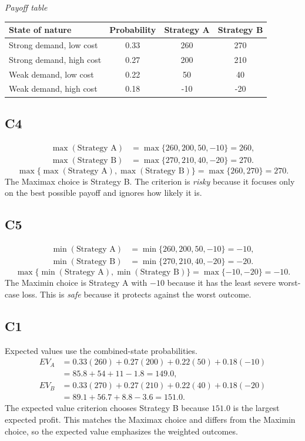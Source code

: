 		\begin{center}
			\textit{Payoff table} \\
			\begin{tabular}{l c c c}
				\toprule
				State of nature & Probability & Strategy A & Strategy B \\
				\midrule
				Strong demand, low cost & 0.33 & 260 & 270 \\
				Strong demand, high cost & 0.27 & 200 & 210 \\
				Weak demand, low cost & 0.22 & 50 & 40 \\
				Weak demand, high cost & 0.18 & -10 & -20 \\
				\bottomrule
			\end{tabular}
		\end{center}

		\subsection*{C4}
		\[
		\begin{aligned}
		\max(\text{Strategy A}) &= \max\{260,200,50,-10\} = 260,\\
		\max(\text{Strategy B}) &= \max\{270,210,40,-20\} = 270.
		\end{aligned}
		\]
		\[
		\max\{\max(\text{Strategy A}), \max(\text{Strategy B})\}
		= \max\{260, 270\}
		= 270.
		\]
		The Maximax choice is Strategy B. The criterion is \emph{risky} because it focuses only on the best possible payoff and ignores how likely it is.

		\subsection*{C5}
		\[
		\begin{aligned}
		\min(\text{Strategy A}) &= \min\{260,200,50,-10\} = -10,\\
		\min(\text{Strategy B}) &= \min\{270,210,40,-20\} = -20.
		\end{aligned}
		\]
		\[
		\max\{\min(\text{Strategy A}), \min(\text{Strategy B})\}
		= \max\{-10, -20\}
		= -10.
		\]
		The Maximin choice is Strategy A with $-10$ because it has the least severe worst-case loss. This is \emph{safe} because it protects against the worst outcome.

		\subsection*{C1}
		Expected values use the combined-state probabilities.
		\[
		\begin{aligned}
		EV_A &= 0.33(260)+0.27(200)+0.22(50)+0.18(-10)\\
		&= 85.8+54+11-1.8=149.0,\\
		EV_B &= 0.33(270)+0.27(210)+0.22(40)+0.18(-20)\\
		&= 89.1+56.7+8.8-3.6=151.0.
		\end{aligned}
		\]
		The expected value criterion chooses Strategy B because $151.0$ is the largest expected profit. This matches the Maximax choice and differs from the Maximin choice, so the expected value emphasizes the weighted outcomes.

